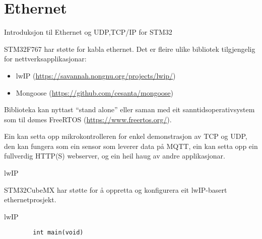 \section{Ethernet}

\begin{frame}{Introduksjon til Ethernet og UDP,TCP/IP for STM32}
	
	STM32F767 har støtte for kabla ethernet. Det er fleire ulike bibliotek tilgjengelig for nettverksapplikasjonar:
	
	\begin{itemize}
		\item lwIP (\url{https://savannah.nongnu.org/projects/lwip/})
		\item Mongoose (\url{https://github.com/cesanta/mongoose})
	\end{itemize}
	
	Biblioteka kan nyttast ``stand alone'' eller saman med eit sanntidsoperativsystem som til dømes FreeRTOS (\url{https://www.freertos.org/}).
	
	Ein kan setta opp mikrokontrolleren for enkel demonstrasjon av TCP og UDP, den kan fungera som ein sensor som leverer data på MQTT, ein kan setta opp ein fullverdig HTTP(S) webserver, og ein heil haug av andre applikasjonar.
	
\end{frame}


\begin{frame}{lwIP}
	
	STM32CubeMX har støtte for å oppretta og konfigurera eit lwIP-basert ethernetprosjekt. 
	
\end{frame}

\begin{frame}[containsverbatim]{lwIP}
	
	
	
	\begin{verbatim}
		int main(void)
	\end{verbatim}
	
\end{frame}


